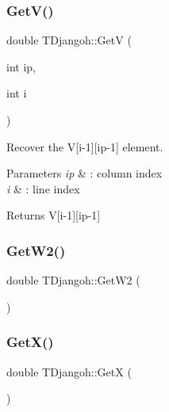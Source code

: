 \mbox{\label{class_t_djangoh_a4993a87fef8917b9ed8a55811aa2daf6}} 
\subsubsection{\texorpdfstring{Get\+V()}{GetV()}}
{\footnotesize\ttfamily double T\+Djangoh\+::\+GetV (\begin{DoxyParamCaption}\item[{int}]{ip,  }\item[{int}]{i }\end{DoxyParamCaption})\hspace{0.3cm}{\ttfamily [inline]}}



Recover the V\mbox{[}i-\/1\mbox{]}\mbox{[}ip-\/1\mbox{]} element. 


\begin{DoxyParams}{Parameters}
{\em ip} & \+: column index \\
\hline
{\em i} & \+: line index \\
\hline
\end{DoxyParams}
\begin{DoxyReturn}{Returns}
V\mbox{[}i-\/1\mbox{]}\mbox{[}ip-\/1\mbox{]} 
\end{DoxyReturn}
\mbox{\label{class_t_djangoh_a94c252e7c5375e9641ad5ea048098c06}} 
\subsubsection{\texorpdfstring{Get\+W2()}{GetW2()}}
{\footnotesize\ttfamily double T\+Djangoh\+::\+Get\+W2 (\begin{DoxyParamCaption}{ }\end{DoxyParamCaption})\hspace{0.3cm}{\ttfamily [inline]}}

\mbox{\label{class_t_djangoh_aa2d4a28a97826cf32b9d623c581da9de}} 
\subsubsection{\texorpdfstring{Get\+X()}{GetX()}}
{\footnotesize\ttfamily double T\+Djangoh\+::\+GetX (\begin{DoxyParamCaption}{ }\end{DoxyParamCaption})\hspace{0.3cm}{\ttfamily [inline]}}

